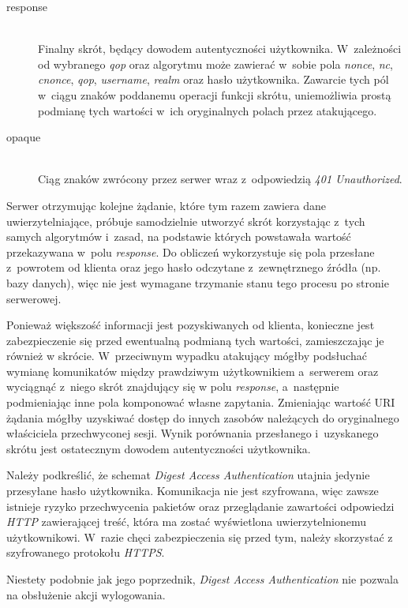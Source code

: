 \documentclass[11pt]{aghdpl}
\begin{document}
\begin{description}
\item[response] \hfill \\
Finalny skrót, będący dowodem autentyczności użytkownika. W~zależności od wybranego \emph{qop} oraz algorytmu może zawierać w~sobie pola \emph{nonce}, \emph{nc}, \emph{cnonce}, \emph{qop}, \emph{username}, \emph{realm} oraz hasło użytkownika. Zawarcie tych pól w~ciągu znaków poddanemu operacji funkcji skrótu, uniemożliwia prostą podmianę tych wartości w~ich oryginalnych polach przez atakującego.
\item[opaque] \hfill \\
Ciąg znaków zwrócony przez serwer wraz z~odpowiedzią \emph{401 Unauthorized}.
\end{description}

Serwer otrzymując kolejne żądanie, które tym razem zawiera dane uwierzytelniające, próbuje samodzielnie utworzyć skrót korzystając z~tych samych algorytmów i~zasad, na podstawie których powstawała wartość przekazywana w~polu \emph{response}. Do obliczeń wykorzystuje się pola przesłane z~powrotem od klienta oraz jego hasło odczytane z~zewnętrznego źródła (np. bazy danych), więc nie jest wymagane trzymanie stanu tego procesu po stronie serwerowej.

Ponieważ większość informacji jest pozyskiwanych od klienta, konieczne jest zabezpieczenie się przed ewentualną podmianą tych wartości, zamieszczając je również w skrócie. W~przeciwnym wypadku atakujący mógłby podsłuchać wymianę komunikatów między prawdziwym użytkownikiem a~serwerem oraz wyciągnąć z~niego skrót znajdujący się w polu \emph{response}, a~następnie podmieniając inne pola komponować własne zapytania. Zmieniając wartość URI żądania mógłby uzyskiwać dostęp do innych zasobów należących do oryginalnego właściciela przechwyconej sesji. Wynik porównania przesłanego i~uzyskanego skrótu jest ostatecznym dowodem autentyczności użytkownika.

Należy podkreślić, że schemat \emph{Digest Access Authentication} utajnia jedynie przesyłane hasło użytkownika. Komunikacja nie jest szyfrowana, więc zawsze istnieje ryzyko przechwycenia pakietów oraz przeglądanie zawartości odpowiedzi \emph{HTTP} zawierającej treść, która ma zostać wyświetlona uwierzytelnionemu użytkownikowi. W~razie chęci zabezpieczenia się przed tym, należy skorzystać z szyfrowanego protokołu \emph{HTTPS}.

Niestety podobnie jak jego poprzednik, \emph{Digest Access Authentication} nie pozwala na obsłużenie akcji wylogowania.
\end{document}
